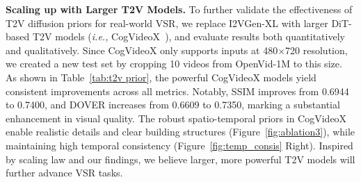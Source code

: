 \noindent
\textbf{Scaling up with Larger T2V Models.}
To further validate the effectiveness of T2V diffusion priors for real-world VSR, we replace I2VGen-XL with larger 
DiT-based \cite{peebles2023scalable} T2V models (\textit{i.e.,} CogVideoX~\cite{cogvideox5b,yang2024cogvideox}), and evaluate results both quantitatively and qualitatively. 
Since CogVideoX only supports inputs at 480$\times$720 resolution, we created a new test set by cropping 10 videos from OpenVid-1M \cite{nan2024openvid} to this size. 
As shown in Table~\ref{tab:t2v prior}, the powerful CogVideoX models yield consistent improvements across all metrics. %
%
%
Notably, SSIM improves from 0.6944 to 0.7400, and DOVER increases from 0.6609 to 0.7350, marking a substantial enhancement in visual quality. 
The robust spatio-temporal priors in CogVideoX enable realistic details and clear building structures (Figure~\ref{fig:ablation3}), while maintaining high temporal consistency (Figure~\ref{fig:temp_consis} Right).
Inspired by scaling law \cite{henighan2020scaling, kaplan2020scaling} and our findings, we believe larger, more powerful T2V models will further advance VSR tasks.


